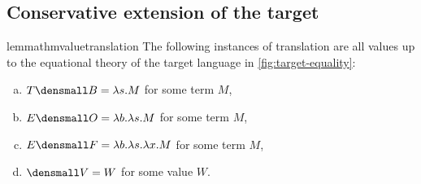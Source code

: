 \allowdisplaybreaks



\subsection{Conservative extension of the target}

\begin{restatable}{lemma}{thmvaluetranslation}
  \label{l-value}
  \label{thm:value-translation}
  The following instances of translation are all values up to the equational
  theory of the target language in \cref{fig:target-equality}:
  \begin{enumerate}[(a)]
  \item $T\den{B} = \lambda s. M$ for some term $M$,
  \item $E\den{O} = \lambda b. \lambda s. M$ for some term $M$,
  \item $E\den{F} = \lambda b. \lambda s. \lambda x. M$ for some term $M$,
  \item $\den{V} = W$ for some value $W$.
  \end{enumerate}
\end{restatable}
